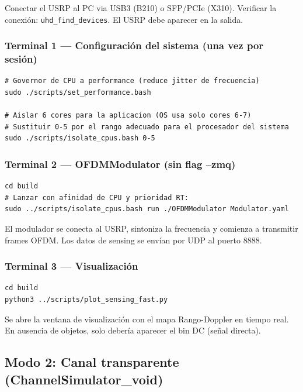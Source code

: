 \documentclass[11pt,a4paper]{article}
\begin{document}
\begin{warnbox}
Conectar el USRP al PC via USB3 (B210) o SFP/PCIe (X310). Verificar la conexión:
\texttt{uhd\_find\_devices}. El USRP debe aparecer en la salida.
\end{warnbox}

\subsubsection{Terminal 1 — Configuración del sistema (una vez por sesión)}

\begin{lstlisting}[style=bash]
# Governor de CPU a performance (reduce jitter de frecuencia)
sudo ./scripts/set_performance.bash

# Aislar 6 cores para la aplicacion (OS usa solo cores 6-7)
# Sustituir 0-5 por el rango adecuado para el procesador del sistema
sudo ./scripts/isolate_cpus.bash 0-5
\end{lstlisting}

\subsubsection{Terminal 2 — OFDMModulator (sin flag --zmq)}

\begin{lstlisting}[style=bash]
cd build
# Lanzar con afinidad de CPU y prioridad RT:
sudo ../scripts/isolate_cpus.bash run ./OFDMModulator Modulator.yaml
\end{lstlisting}

El modulador se conecta al USRP, sintoniza la frecuencia y comienza a transmitir
frames OFDM. Los datos de sensing se envían por UDP al puerto 8888.

\subsubsection{Terminal 3 — Visualización}

\begin{lstlisting}[style=bash]
cd build
python3 ../scripts/plot_sensing_fast.py
\end{lstlisting}

Se abre la ventana de visualización con el mapa Rango-Doppler en tiempo real.
En ausencia de objetos, solo debería aparecer el bin DC (señal directa).

\subsection{Modo 2: Canal transparente (ChannelSimulator\_void)}
\label{sec:modo_void}
\end{document}
